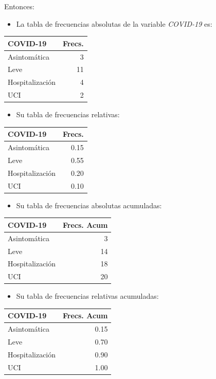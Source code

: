 \documentclass[
  spanish,
  letterpaper,
  DIV=11,
  numbers=noendperiod]{scrreprt}
\providecommand{\tightlist}{%
  \setlength{\itemsep}{0pt}\setlength{\parskip}{0pt}}
\begin{document}
Entonces:

\begin{itemize}
\tightlist
\item
  La tabla de frecuencias absolutas de la variable \emph{COVID-19} es:
\end{itemize}

\begin{longtable*}[t]{lr}
\toprule
COVID-19 & Frecs.\\
\midrule
Asintomática & 3\\
Leve & 11\\
Hospitalización & 4\\
UCI & 2\\
\bottomrule
\end{longtable*}

\begin{itemize}
\tightlist
\item
  Su tabla de frecuencias relativas:
\end{itemize}

\begin{longtable*}[t]{lr}
\toprule
COVID-19 & Frecs.\\
\midrule
Asintomática & 0.15\\
Leve & 0.55\\
Hospitalización & 0.20\\
UCI & 0.10\\
\bottomrule
\end{longtable*}

\begin{itemize}
\tightlist
\item
  Su tabla de frecuencias absolutas acumuladas:
\end{itemize}

\begin{longtable*}[t]{lr}
\toprule
COVID-19 & Frecs. Acum\\
\midrule
Asintomática & 3\\
Leve & 14\\
Hospitalización & 18\\
UCI & 20\\
\bottomrule
\end{longtable*}

\begin{itemize}
\tightlist
\item
  Su tabla de frecuencias relativas acumuladas:
\end{itemize}

\begin{longtable*}[t]{lr}
\toprule
COVID-19 & Frecs. Acum\\
\midrule
Asintomática & 0.15\\
Leve & 0.70\\
Hospitalización & 0.90\\
UCI & 1.00\\
\bottomrule
\end{longtable*}
\end{document}
